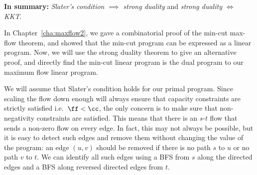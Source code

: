 \textbf{In summary:} \emph{Slater's condition $\implies$ strong duality}
and \emph{strong duality $\iff$ KKT}.

\begin{example}
  In Chapter~\ref{cha:maxflow2}, we gave a combinatorial proof of the min-cut max-flow
  theorem, and showed that the min-cut program can be expressed as a
  linear program. Now, we will use the strong duality theorem to give
  an alternative proof, and directly find the min-cut linear program
  is the dual program to our maximum flow linear program.

  We will assume that Slater's condition holds for our primal
  program.
  Since scaling the flow down enough will always ensure that
  capacity constraints are strictly satisfied i.e.\ $\ff < \cc$, the
  only concern is to make sure that non-negativity constraints are satisfied.
  This means that there is an $s$-$t$ flow that sends a non-zero flow
  on every edge.
  In fact, this may not always be possible, but it is
  easy to detect such edges and remove them without changing the value
  of the program: an edge $(u,v)$ should be removed if there is no
  path $s$ to $u$ or no path $v$ to $t$. We can identify all such
  edges using a BFS from $s$ along
  the directed edges and a BFS along reversed directed edges from $t$.


\end{example}
